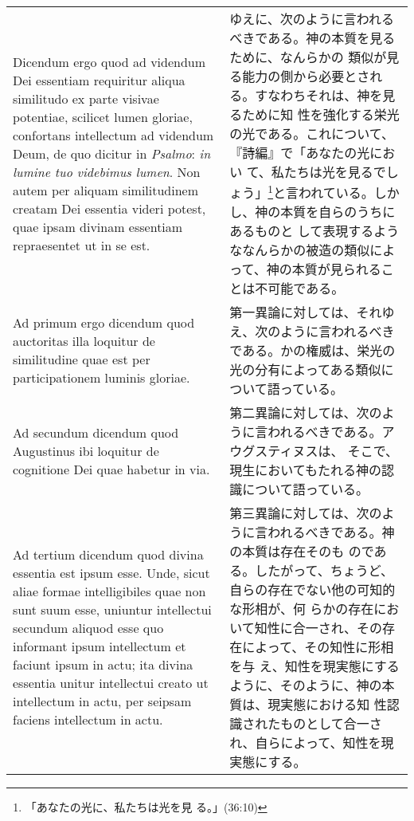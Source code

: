 \documentclass[10pt]{jsarticle} %
\begin{document}
\begin{longtable}{p{21em}p{21em}}
\\

Dicendum ergo quod ad videndum Dei essentiam requiritur aliqua
similitudo ex parte visivae potentiae, scilicet lumen gloriae,
confortans intellectum ad videndum Deum, de quo dicitur in {\itshape
Psalmo}: {\it in lumine tuo videbimus lumen}. Non autem per aliquam
similitudinem creatam Dei essentia videri potest, quae ipsam divinam
essentiam repraesentet ut in se est.

&

ゆえに、次のように言われるべきである。神の本質を見るために、なんらかの
類似が見る能力の側から必要とされる。すなわちそれは、神を見るために知
性を強化する栄光の光である。これについて、『詩編』で「あなたの光におい
て、私たちは光を見るでしょう」\footnote{「あなたの光に、私たちは光を見
る。」(36:10)}と言われている。しかし、神の本質を自らのうちにあるものと
して表現するようななんらかの被造の類似によって、神の本質が見られるこ
とは不可能である。

\\

{\sc  Ad primum ergo dicendum} quod auctoritas illa loquitur de
similitudine quae est per participationem luminis gloriae.  

&

第一異論に対しては、それゆえ、次のように言われるべきである。かの権威は、栄光の
光の分有によってある類似について語っている。

\\

{\sc  Ad secundum dicendum} quod Augustinus ibi loquitur de
cognitione Dei quae habetur in via.

&

第二異論に対しては、次のように言われるべきである。アウグスティヌスは、
そこで、現生においてもたれる神の認識について語っている。

\\

{\sc Ad tertium dicendum} quod divina essentia est ipsum esse. Unde,
sicut aliae formae intelligibiles quae non sunt suum esse, uniuntur
intellectui secundum aliquod esse quo informant ipsum intellectum et
faciunt ipsum in actu; ita divina essentia unitur intellectui creato
ut intellectum in actu, per seipsam faciens intellectum in actu.

&

第三異論に対しては、次のように言われるべきである。神の本質は存在そのも
のである。したがって、ちょうど、自らの存在でない他の可知的な形相が、何
らかの存在において知性に合一され、その存在によって、その知性に形相を与
え、知性を現実態にするように、そのように、神の本質は、現実態における知
性認識されたものとして合一され、自らによって、知性を現実態にする。

\end{longtable}
\newpage
\end{document}
